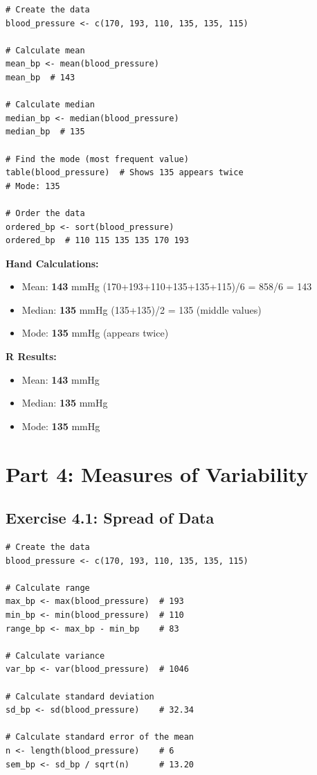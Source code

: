 \documentclass[11pt]{article}
\begin{document}
\begin{lstlisting}
# Create the data
blood_pressure <- c(170, 193, 110, 135, 135, 115)

# Calculate mean
mean_bp <- mean(blood_pressure)
mean_bp  # 143

# Calculate median
median_bp <- median(blood_pressure)
median_bp  # 135

# Find the mode (most frequent value)
table(blood_pressure)  # Shows 135 appears twice
# Mode: 135

# Order the data
ordered_bp <- sort(blood_pressure)
ordered_bp  # 110 115 135 135 170 193
\end{lstlisting}

\textbf{Hand Calculations:}
\begin{itemize}
\item Mean: \textcolor{answergreen}{\textbf{143}} mmHg \textcolor{answergreen}{(170+193+110+135+135+115)/6 = 858/6 = 143}
\item Median: \textcolor{answergreen}{\textbf{135}} mmHg \textcolor{answergreen}{(135+135)/2 = 135 (middle values)}
\item Mode: \textcolor{answergreen}{\textbf{135}} mmHg \textcolor{answergreen}{(appears twice)}
\end{itemize}

\textbf{R Results:}
\begin{itemize}
\item Mean: \textcolor{answergreen}{\textbf{143}} mmHg
\item Median: \textcolor{answergreen}{\textbf{135}} mmHg
\item Mode: \textcolor{answergreen}{\textbf{135}} mmHg
\end{itemize}

\newpage
\section{Part 4: Measures of Variability}

\subsection{Exercise 4.1: Spread of Data}
\begin{lstlisting}
# Create the data
blood_pressure <- c(170, 193, 110, 135, 135, 115)

# Calculate range
max_bp <- max(blood_pressure)  # 193
min_bp <- min(blood_pressure)  # 110
range_bp <- max_bp - min_bp    # 83

# Calculate variance
var_bp <- var(blood_pressure)  # 1046

# Calculate standard deviation
sd_bp <- sd(blood_pressure)    # 32.34

# Calculate standard error of the mean
n <- length(blood_pressure)    # 6
sem_bp <- sd_bp / sqrt(n)      # 13.20
\end{lstlisting}
\end{document}
